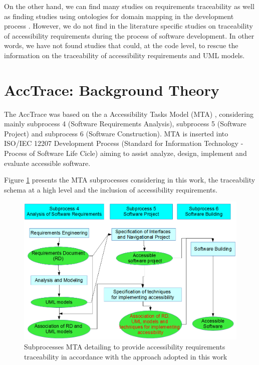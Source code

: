 \documentclass[10pt, conference, compsocconf]{IEEEtran}
\begin{document}
On the other hand, we can find many studies on requirements traceability \cite{5970169,292398,5485417,6405269}
as well as finding studies using 
ontologies for domain mapping in the development process \cite{5223183,6511842,4148940,5362244}. However, we do not find in the literature specific studies on traceability of
accessibility requirements during the process of software development. 
In other words, we have not found studies that could, at the code level, to rescue the information on the traceability of accessibility 
requirements and UML models.


\section{AccTrace: Background Theory}

The AccTrace was based on the a Accessibility Tasks Model (MTA) 
\cite {maia:10}, considering mainly  subprocess 4 (Software Requirements Analysis), subprocess 5
(Software Project) and subprocess 6 (Software Construction). MTA is inserted into ISO/IEC 12207 Development Process (Standard for Information Technology - Process of Software Life Cicle) aiming to assist analyze, design, implement and evaluate accessible software.

Figure \ref{fig:figmagica} presents the MTA subprocesses considering in this work, the traceability schema
at a high level and the inclusion of accessibility requirements.

\begin{figure}[h!]
\centering
\includegraphics[scale=0.45]{img/figuramagica.png}
\caption{Subprocesses MTA detailing to provide 
accessibility requirements traceability in accordance with the approach adopted in this work}
\label{fig:figmagica}
\end{figure}
\end{document}
